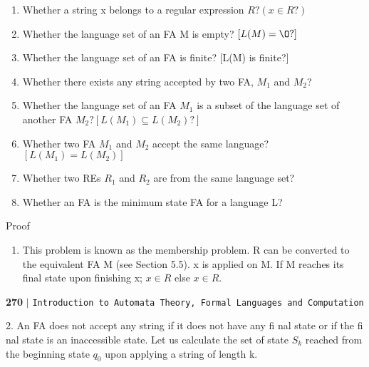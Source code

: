 \documentclass{article}
\begin{document}
\begin{enumerate}
  \item Whether a string x belongs to a regular expression $R? (x \in R?)$ \\
  \item Whether the language set of an FA M is empty? $[L(M) = {\O} ?]$ \\
  \item Whether the language set of an FA is finite? [L(M) is finite?] \\
  \item Whether there exists any string accepted by two FA, $M_1$ and $M_2$? \\
  \item Whether the language set of an FA $M_1$ is a subset of the language set of another FA $M_2? [L(M_1) \subseteq
L(M_2)?]$ \\
  \item Whether two FA $M_1$ and $M_2$ accept the same language? $[L(M_1) = L(M_2)]$ \\
  \item Whether two REs $R_1$ and $R_2$ are from the same language set?\\
  \item Whether an FA is the minimum state FA for a language L? \\
\end{enumerate}

\vspace*{0.3cm}
Proof\\
\begin{enumerate}
  \item This problem is known as the membership problem. R can be converted to the equivalent FA M
(see Section 5.5). x is applied on M. If M reaches its final state upon finishing x; $x \in R$ else $x \in R$.\\
\end{enumerate}

\newpage
\begin{flushleft}
    \textbf{270}\hspace*{0.1cm} \textbf{$|$} \hspace*{0.1cm} \texttt{Introduction to Automata Theory, Formal Languages and Computation}
  \end{flushleft}

\vspace*{0.5cm}
\textcolor[rgb]{0.00,0.00,1.00}{2}. An FA does not accept any string if it does not have any fi nal state or if the fi nal state is an
inaccessible state. Let us calculate the set of state $S_k$ reached from the beginning state $q_0$ upon
applying a string of length k.\\
\end{document}
